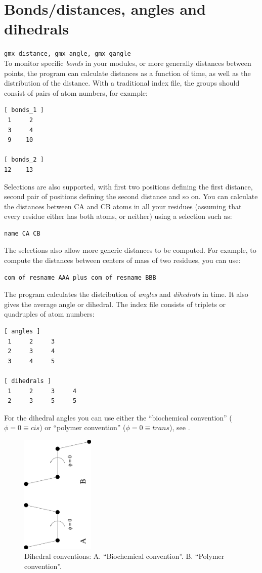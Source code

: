 \section{Bonds/distances, angles and dihedrals}
\label{sec:bad}
{\tt gmx distance, gmx angle, gmx gangle}\\
To monitor specific {\em bonds} in your modules, or more generally
distances between points, the program
{\tt {}} can calculate distances as a function of
time, as well as the distribution of the distance.
With a traditional index file, the groups should consist of pairs of
atom numbers, for example:
\begin{verbatim}
[ bonds_1 ]
 1     2
 3     4
 9    10

[ bonds_2 ]
12    13
\end{verbatim}
Selections are also supported, with first two positions defining the
first distance, second pair of positions defining the second distance
and so on.  You can calculate the distances between CA and CB atoms in
all your residues (assuming that every residue either has both atoms, or
neither) using a selection such as:
\begin{verbatim}
name CA CB
\end{verbatim}
The selections also allow more generic distances to be computed.
For example, to compute the distances between centers of mass of two
residues, you can use:
\begin{verbatim}
com of resname AAA plus com of resname BBB
\end{verbatim}

The program {\tt {}} calculates the distribution of {\em angles} and
{\em dihedrals} in time. It also gives the average angle or dihedral. 
The index file consists of triplets or quadruples of atom numbers:

\begin{verbatim}
[ angles ]
 1     2     3
 2     3     4
 3     4     5

[ dihedrals ]
 1     2     3     4
 2     3     5     5
\end{verbatim}

For the dihedral angles you can use either the ``biochemical convention'' 
($\phi = 0 \equiv cis$) or ``polymer convention'' ($\phi = 0 \equiv trans$), 
see .

\begin{figure}
\centerline{
{\includegraphics[width=3.5cm,angle=270]{plots/dih-def}}}
\caption[Dihedral conventions.]{Dihedral conventions: A. ``Biochemical
convention''. B. ``Polymer convention''.}
\label{fig:dih_def}
\end{figure}

